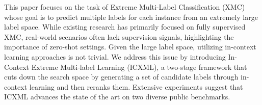 This paper focuses on the task of Extreme Multi-Label Classification (XMC) whose goal is to predict multiple labels for each instance from an extremely large label space. While existing research has primarily focused on fully supervised XMC, real-world scenarios often lack supervision signals, highlighting the importance of zero-shot settings. Given the large label space, utilizing in-context learning approaches is not trivial. We address this issue by introducing In-Context Extreme Multi-label Learning (ICXML), a two-stage framework that cuts down the search space by generating a set of candidate labels through in-context learning and then reranks them. Extensive experiments suggest that ICXML advances the state of the art on two diverse public benchmarks.